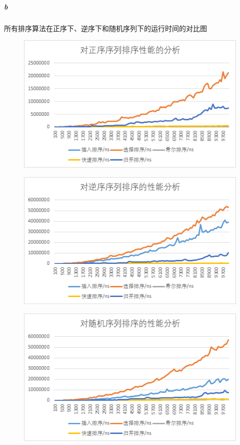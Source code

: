 \documentclass[UTF8]{ctexart}
\begin{document}
      \subparagraph{b} 所有排序算法在正序下、逆序下和随机序列下的运行时间的对比图
        \begin{figure}[H]
          \includegraphics[width=\textwidth]{seq}
          \centering
        \end{figure}
        \begin{figure}[H]
          \includegraphics[width=\textwidth]{rev}
          \centering
        \end{figure}
        \begin{figure}[H]
          \includegraphics[width=\textwidth]{random}
          \centering
        \end{figure}
\end{document}
